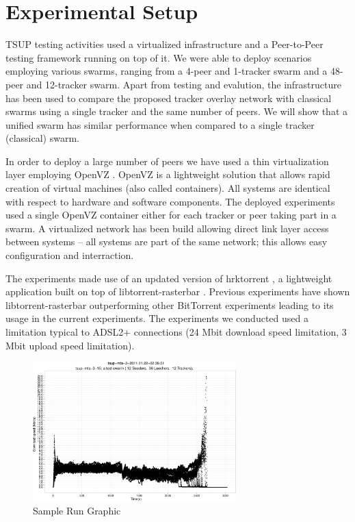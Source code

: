 \section{Experimental Setup}
\label{sec:unified-tracker:setup}

TSUP testing activities used a virtualized infrastructure and a
Peer-to-Peer testing framework running on top of it. We were able to deploy
scenarios employing various swarms, ranging from a 4-peer and 1-tracker swarm
and a 48-peer and 12-tracker swarm. Apart from testing and evalution, the
infrastructure has been used to compare the proposed tracker overlay network
with classical swarms using a single tracker and the same number of peers. We
will show that a unified swarm has similar performance when compared to a
single tracker (classical) swarm.

In order to deploy a large number of peers we have used a thin virtualization
layer employing OpenVZ \cite{openvz}. OpenVZ is a lightweight solution that
allows rapid creation of virtual machines (also called containers). All
systems are identical with respect to hardware and software components. The
deployed experiments used a single OpenVZ container either for each tracker or
peer taking part in a swarm. A virtualized network has been build allowing
direct link layer access between systems -- all systems are part of the same
network; this allows easy configuration and interraction.

The experiments made use of an updated version of hrktorrent \cite{hrk}, a
lightweight application built on top of libtorrent-rasterbar
\cite{libtorrent}. Previous experiments \cite{bt-vi} have shown
libtorrent-rasterbar outperforming other BitTorrent experiments leading to its
usage in the current experiments. The
experiments we conducted used a limitation typical to ADSL2+ connections (24
Mbit download speed limitation, 3 Mbit upload speed limitation).

\begin{figure}[h]
  \begin{center}
    \includegraphics[width=0.7\textwidth]{src/img/unified-tracker/tsup-sample-run-48peers}
  \end{center}
  \caption{Sample Run Graphic}
  \label{fig:unified-tracker:tsup-sample-run}
\end{figure}

